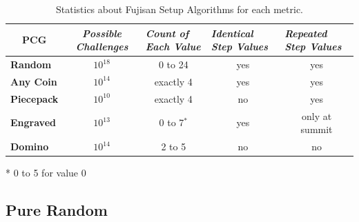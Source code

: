 \documentclass[journal]{IEEEtran}
\begin{document}
\begin{table}[]
\centering
\renewcommand{\arraystretch}{1.3}
\caption{Statistics about Fujisan Setup Algorithms for each metric.}
\label{table_stats}
\begin{tabular}{l|c|c|c|c|}
\multicolumn{1}{c|}{\textbf{PCG}} & \multicolumn{1}{c|}{\textit{\textbf{Possible Challenges}}} & \multicolumn{1}{l|}{\textit{\textbf{Count of Each Value}}} & \multicolumn{1}{l|}{\textit{\textbf{Identical Step Values}}} & \multicolumn{1}{l|}{\textit{\textbf{Repeated Step Values}}} \\ \hline
\textbf{Random}                   & $10^{18}$                                  & 0 to 24                                                    & yes                                                      & yes                                                            \\ \hline
\textbf{Any Coin}                 & $10^{14}$ & exactly 4                                                  & yes                                                      & yes                                                            \\ \hline
\textbf{Piecepack}                & $10^{10}$                                             & exactly 4                                                  & no                                                       & yes                                                            \\ \hline
\textbf{Engraved}                 & $10^{13}$                                                 & 0 to 7$^*$                                                     & yes                                                      & only at summit                                                 \\ \hline
\textbf{Domino}                   & $10^{14} $                                                   & 2 to 5                                                     & no                                                       & no                                                             \\ \hline
\end{tabular}

\vspace{0.2cm} * 0 to 5 for value 0
\end{table}

\subsection{Pure Random}
\end{document}
